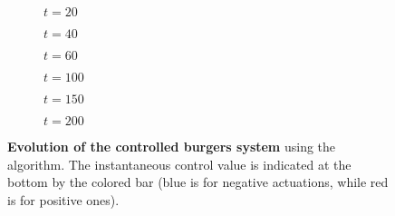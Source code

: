 \begin{figure}
\centering

\begin{subfigure}[t]{.3\textwidth}
	\centering
    	\caption{$t=20$}
	\label{fig:burgers_field_20}
\end{subfigure} \quad
\begin{subfigure}[t]{.3\textwidth}
	\centering
    	\caption{$t=40$}
	\label{fig:burgers_field_40}
\end{subfigure} \quad
\begin{subfigure}[t]{.3\textwidth}
	\centering
    	\caption{$t=60$}
	\label{fig:burgers_field_60}
\end{subfigure}

\medskip

\begin{subfigure}[t]{.3\textwidth}
	\centering
    	\caption{$t=100$}
	\label{fig:burgers_field_100}
\end{subfigure} \quad
\begin{subfigure}[t]{.3\textwidth}
	\centering
    	\caption{$t=150$}
	\label{fig:burgers_field_150}
\end{subfigure} \quad
\begin{subfigure}[t]{.3\textwidth}
	\centering
    	\caption{$t=200$}
	\label{fig:burgers_field_200}
\end{subfigure}

\caption{\textbf{Evolution of the controlled burgers system} using the \ppo algorithm. The instantaneous control value is indicated at the bottom by the colored bar (blue is for negative actuations, while red is for positive ones).}
\label{fig:burgers_fields}
\end{figure} 
